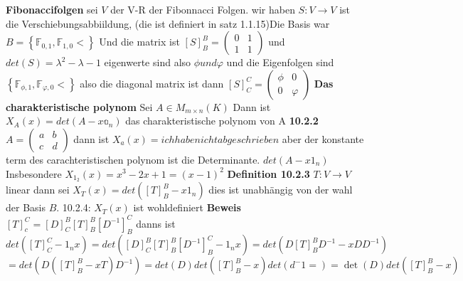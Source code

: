 \documentclass{article}
\begin{document}
\textbf{Fibonaccifolgen} sei $V$ der V-R der Fibonnacci Folgen. wir haben $S:V\rightarrow V$ ist die Verschiebungsabbiildung, (die ist definiert in satz 1.1.15)\newline Die Basis war $B=\left\lbrace\mathbb{F}_{0,1}, \mathbb{F}_{1,0}<\right\rbrace$
Und die matrix ist $[S]^B_B=\begin{pmatrix}0&1\\1&1\end{pmatrix}$ und $det(S)=\lambda^2-\lambda-1$ eigenwerte sind also $\phi und \varphi$ und die Eigenfolgen sind $\left\lbrace\mathbb{F}_{\phi,1}, \mathbb{F}_{\varphi,0}<\right\rbrace$ also die diagonal matrix ist dann $[S]^C_C=\begin{pmatrix}\phi&0\\0&\varphi\end{pmatrix}$
\textbf{Das charakteristische polynom} Sei $A\in M_{m\times n}(K)$ Dann ist $X_A(x)=det(A-x\mathbb{a}_n)$ das charakteristische polynom von A\newline
\textbf{10.2.2} $A=\begin{pmatrix}a&b\\c&d\end{pmatrix}$ dann ist $X_a(x)=ichhabe nicht abgeschrieben$ aber der konstante term des carachteristischen polynom ist die Determinante.\newline
\textbf{}$det(A-x1_n)$ Insbesondere $X_{1_2}(x)=x^3-2x+1=(x-1)^2$ 
\newline
\textbf{Definition 10.2.3} $T:V\rightarrow V$ linear dann sei $X_T(x)=det([T]_B^B-x1_n)$ dies ist unabhängig von der wahl der Basis $B$. 10.2.4: $X_T(x)$ ist wohldefiniert
\newline
\textbf{Beweis} $[T]_c^C=[D]^B_C[T]_B^B[D^{-1}]^C_B$ danns ist \[det([T]_C^C-1_nx) =det([D]^B_C[T]_B^B[D^{-1}]^C_B-1_nx)=det(D[T]^B_BD^{-1}-xDD^{-1})\]\[=det(D([T]^B_B-xT)D^{-1})=det(D)det([T]^B_B-x)det(d^-1=)=\det(D)det([T]^B_B-x)\]
\end{document}
